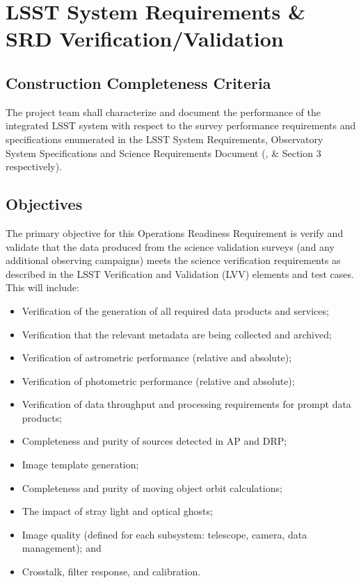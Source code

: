 \section{LSST System Requirements \& SRD Verification/Validation}  \label{sec:srd}

\subsection{Construction Completeness Criteria}
The project team shall characterize and document the performance of the integrated LSST system with respect to the survey performance requirements and specifications enumerated in the LSST System Requirements, Observatory System Specifications and Science Requirements Document (,  \&  Section 3 respectively).

\subsection{Objectives}

The primary objective for this Operations Readiness Requirement is verify and validate that the data produced from the science validation surveys (and any additional observing campaigns) meets the science verification requirements as described in the LSST Verification and Validation (LVV) elements and test cases. This will include:

\begin{itemize}
	\item Verification of the generation of all required data products and services;
 	\item Verification that the relevant metadata are being collected and archived;
	\item Verification of astrometric performance (relative and absolute);
	\item Verification of photometric performance (relative and absolute);
	\item Verification of data throughput and processing requirements for prompt data products;  
	\item Completeness and purity of sources detected in AP and DRP;
	\item Image template generation;
	\item Completeness and purity of moving object orbit calculations;
	\item The impact of stray light and optical ghosts;
	\item Image quality (defined for each subsystem: telescope, camera, data management); and
	\item Crosstalk, filter response, and calibration.	
\end{itemize}

